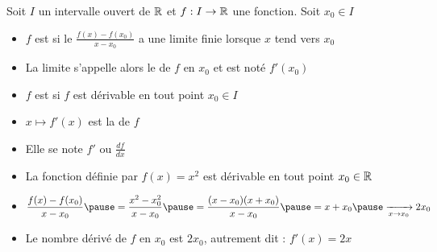 \begin{frame}

Soit $I$ un intervalle ouvert de $\mathbb{R}$ et $f : I \to \mathbb{R}$ une fonction. Soit $x_0 \in I$

\pause

\begin{mydefinition}
\begin{itemize}
  \item $f$ est  si le  $\frac{f(x)-f(x_0)}{x-x_0}$ 
a une limite finie lorsque $x$ tend vers $x_0$
\pause
  \item La limite s'appelle alors le  de $f$ en $x_0$ et est noté $f'(x_0)$

\end{itemize}
\pause
{} 
\end{mydefinition}

\end{frame}


\begin{frame}
\begin{mydefinition}
\begin{itemize}
  \item $f$ est  si $f$ est dérivable en tout point $x_0 \in I$
\pause
  \item $x \mapsto f'(x)$ est la  de $f$
\pause
  \item Elle se note $f'$ ou $\frac{df}{dx}$
\end{itemize}
\end{mydefinition}

\pause
\bigskip

\begin{exemple}
\begin{itemize}
  \item La fonction définie par $f(x)=x^2$  est dérivable en tout point $x_0 \in \mathbb{R}$
\pause
\medskip

  \item $\displaystyle \frac{f(x)-f(x_0)}{x-x_0} \pause= \frac{x^2-x_0^2}{x-x_0} 
  \pause= \frac{(x-x_0)(x+x_0)}{x-x_0}\pause=x+x_0 \pause\xrightarrow[x \to x_0]{} 2x_0$
\pause
\medskip

  \item Le nombre dérivé de $f$ en $x_0$ est $2x_0$, autrement dit : $f'(x)=2x$
\end{itemize}
\end{exemple}

\end{frame}


